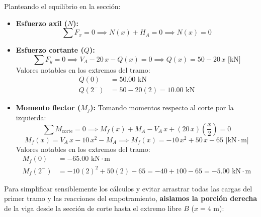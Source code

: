 Planteando el equilibrio en la sección:
\begin{itemize}
    \item \textbf{Esfuerzo axil ($N$):}
          \begin{equation}
              \sum F_x = 0 \implies N(x) + H_A = 0 \implies \boxed{N(x) = 0}
          \end{equation}

    \item \textbf{Esfuerzo cortante ($Q$):}
          \begin{equation}
              \sum F_y = 0 \implies V_A - 20\,x - Q(x) = 0 \implies \boxed{Q(x) = 50 - 20\,x\text{ [kN]}}
          \end{equation}
          Valores notables en los extremos del tramo:
          \begin{align*}
              Q(0)   & = 50.00\text{ kN}              \\
              Q(2^-) & = 50 - 20(2) = 10.00\text{ kN}
          \end{align*}

    \item \textbf{Momento flector ($M_f$):}
          Tomando momentos respecto al corte por la izquierda:
          \begin{equation}
              \sum M_{\text{corte}} = 0 \implies M_f(x) + M_A - V_A\,x + (20\,x)\left(\frac{x}{2}\right) = 0
          \end{equation}
          \begin{equation}
              M_f(x) = V_A\,x - 10\,x^2 - M_A \implies \boxed{M_f(x) = -10\,x^2 + 50\,x - 65\text{ [kN}\cdot\text{m]}}
          \end{equation}
          Valores notables en los extremos del tramo:
          \begin{align*}
              M_f(0)   & = -65.00\text{ kN}\cdot\text{m}                                         \\
              M_f(2^-) & = -10(2)^2 + 50(2) - 65 = -40 + 100 - 65 = -5.00\text{ kN}\cdot\text{m}
          \end{align*}
\end{itemize}


Para simplificar sensiblemente los cálculos y evitar arrastrar todas las cargas del primer tramo y las reacciones del empotramiento, \textbf{aislamos la porción derecha} de la viga desde la sección de corte hasta el extremo libre $B$ ($x = 4\text{ m}$):

